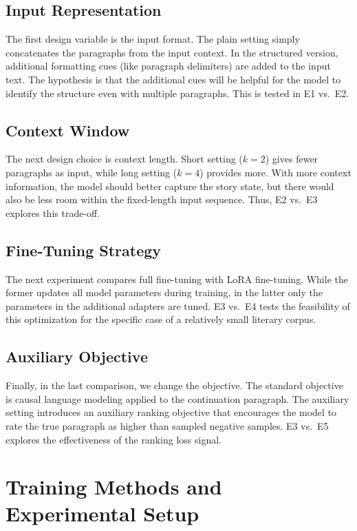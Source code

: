 \documentclass{article}
\newcommand{\expid}[1]{\textsc{#1}}
\begin{document}
\subsection{Input Representation}

The first design variable is the input format. The plain setting simply concatenates the paragraphs from the input context. In the structured version, additional formatting cues (like paragraph delimiters) are added to the input text. The hypothesis is that the additional cues will be helpful for the model to identify the structure even with multiple paragraphs. This is tested in \expid{E1} vs.\ \expid{E2}.

\subsection{Context Window}

The next design choice is context length. Short setting ($k=2$) gives fewer paragraphs as input, while long setting ($k=4$) provides more. With more context information, the model should better capture the story state, but there would also be less room within the fixed-length input sequence. Thus, \expid{E2} vs.\ \expid{E3} explores this trade-off.

\subsection{Fine-Tuning Strategy}

The next experiment compares full fine-tuning with LoRA fine-tuning. While the former updates all model parameters during training, in the latter only the parameters in the additional adapters are tuned. \expid{E3} vs.\ \expid{E4} tests the feasibility of this optimization for the specific case of a relatively small literary corpus.

\subsection{Auxiliary Objective}

Finally, in the last comparison, we change the objective. The standard objective is causal language modeling applied to the continuation paragraph. The auxiliary setting introduces an auxiliary ranking objective that encourages the model to rate the true paragraph as higher than sampled negative samples. \expid{E3} vs.\ \expid{E5} explores the effectiveness of the ranking loss signal.

\section{Training Methods and Experimental Setup}
\end{document}

